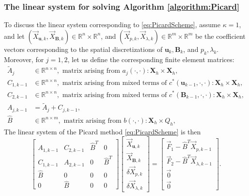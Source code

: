 \documentclass[3p]{elsarticle}
\def\V#1{\mathbf{#1}}
\def\VX{\mathbf{X}}
\begin{document}
\subsubsection{The linear system for solving Algorithm \ref{algorithm:Picard}}\label{subsec:PicardSystem}
To discuss the linear system corresponding to  \eqref{eq:PicardScheme}, assume $\kappa=1$, and let $(\overrightarrow{X}_{\V{u},k}, \overrightarrow{X}_{\V{B},k}) \in \mathbb{R}^n \times \mathbb{R}^n$, and $(\overrightarrow{X}_{p,k}, \overrightarrow{X}_{\lambda,k}) \in \mathbb{R}^m \times \mathbb{R}^m$ be the coefficient vectors corresponding to the spatial discretizations of $\V{u}_k, \V{B}_k$, and $p_k, \lambda_k$. Moreover, for $j=1,2$, let us define the corresponding finite element matrices: 
\begin{equation}
\label{eq:FEM_Matrices}
    \begin{aligned}
     \widetilde{A}_j &\in \mathbb{R}^{n \times n}, \text{ matrix arising from } a_j(\cdot,\cdot):\VX_h \times \VX_h, \\
     C_{1,k-1} &\in \mathbb{R}^{n \times n}, \text{ matrix arising from mixed terms of } c^*(\V{u}_{k-1},\cdot,\cdot):\VX_h \times \VX_h, \\
     C_{2,k-1} &\in \mathbb{R}^{n \times n}, \text{ matrix arising from mixed terms of } c^*(\V{B}_{k-1},\cdot,\cdot):\VX_h \times \VX_h, \\
     A_{j,k-1} & = \widetilde{A}_j + C_{j,k-1}, \\
     \widehat{B} &\in \mathbb{R}^{n \times m}, \text{ matrix arising from } b(\cdot,\cdot): \VX_h \times Q_h,
    \end{aligned}
\end{equation}
The linear system of the Picard method \eqref{eq:PicardScheme} is then
\begin{equation}\label{eq:PicardSystem1}
\begin{bmatrix} 
A_{1,k-1} & C_{2,k-1} & \widehat{B}^T & 0 \\ 
C_{1,k-1} & A_{2,k-1} &  0  & \widehat{B}^T \\
\widehat{B}         &  0        &  0  & 0 \\
0                   &  \widehat{B}  &  0  & 0
\end{bmatrix}
\begin{bmatrix} \overrightarrow{X}_{\V{u},k}  \\ 
\overrightarrow{X}_{\V{B},k}  \\
\delta \overrightarrow{X}_{p,k} \\
\delta \overrightarrow{X}_{\lambda,k}
\end{bmatrix}
= \begin{bmatrix} 
\overrightarrow{F}_1 - \widehat{B}^T \overrightarrow{X}_{p,k-1} \\ \overrightarrow{F}_2 - \widehat{B}^T \overrightarrow{X}_{\lambda,k-1} \\ \overrightarrow{0} \\ \overrightarrow{0}
\end{bmatrix}.
\end{equation}
\end{document}
